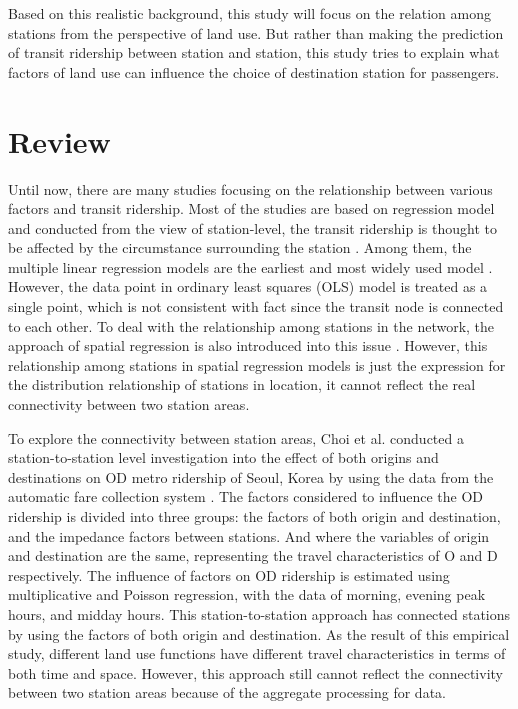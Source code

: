 Based on this realistic background, this study will focus on the relation among stations from the perspective of land use. But rather than making the prediction of transit ridership between station and station, this study tries to explain what factors of land use can influence the choice of destination station for passengers. 

\section{Review}
%
Until now, there are many studies focusing on the relationship between various factors and transit ridership. Most of the studies are based on regression model and conducted from the view of station-level, the transit ridership is thought to be affected by the circumstance surrounding the station \cite{cervero1997travel,taylor2003analyzing,zhao2005transit,estupinan2008relationship,taylor2009nature,sohn2010factors,gutierrez2011transit,jun2015land}. Among them, the multiple linear regression models are the earliest and most widely used model \cite{cervero1997travel,gutierrez2011transit}. However, the data point in ordinary least squares (OLS) model is treated as a single point, which is not consistent with fact since the transit node is connected to each other. To deal with the relationship among stations in the network, the approach of spatial regression is also introduced into this issue \cite{cardozo2012application,jun2015land}. However, this relationship among stations in spatial regression models is just the expression for the distribution relationship of stations in location, it cannot reflect the real connectivity between two station areas.

%
To explore the connectivity between station areas, Choi et al. conducted a station-to-station level investigation into the effect of both origins and destinations on OD metro ridership of Seoul, Korea by using the data from the automatic fare collection system \cite{choi2012analysis}. The factors considered to influence the OD ridership is divided into three groups: the factors of both origin and destination, and the impedance factors between stations. And where the variables of origin and destination are the same, representing the travel characteristics of O and D respectively. The influence of factors on OD ridership is estimated using multiplicative and Poisson regression, with the data of morning, evening peak hours, and midday hours. This station-to-station approach has connected stations by using the factors of both origin and destination. As the result of this empirical study, different land use functions have different travel characteristics in terms of both time and space. However, this approach still cannot reflect the connectivity between two station areas because of the aggregate processing for data.

